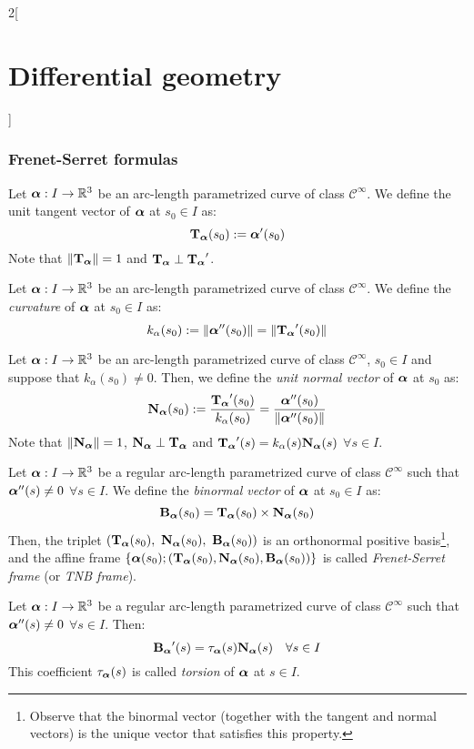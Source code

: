 \documentclass[../../../main.tex]{subfiles}
\begin{document}
\begin{multicols}{2}[\section{Differential geometry}]
  \subsubsection{Frenet-Serret formulas}
  \begin{definition}
    Let $\vf{\alpha}:I\rightarrow\RR^3$ be an arc-length parametrized curve of class $\mathcal{C}^\infty$. We define the unit tangent vector of $\vf{\alpha}$ at $s_0\in I$ as: $$\T\alpha(s_0):=\vf{\alpha}'(s_0)$$ Note that $\|\T\alpha\|=1$ and $\T\alpha\perp\T\alpha'$.
  \end{definition}
  \begin{definition}
    Let $\vf{\alpha}:I\rightarrow\RR^3$ be an arc-length parametrized curve of class $\mathcal{C}^\infty$. We define the \emph{curvature} of $\vf{\alpha}$ at $s_0\in I$ as: $$k_\alpha(s_0):=\|\vf{\alpha}''(s_0)\|=\|\T\alpha'(s_0)\|$$
  \end{definition}
  \begin{definition}
    Let $\vf{\alpha}:I\rightarrow\RR^3$ be an arc-length parametrized curve of class $\mathcal{C}^\infty$, $s_0\in I$ and suppose that $k_\alpha(s_0)\ne 0$. Then, we define the \emph{unit normal vector} of $\vf{\alpha}$ at $s_0$ as: $$\N\alpha(s_0):=\frac{\T\alpha'(s_0)}{k_\alpha(s_0)}=\frac{\vf{\alpha}''(s_0)}{\|\vf{\alpha}''(s_0)\|}$$
    Note that $\|\N\alpha\|=1$, $\N\alpha\perp\T\alpha$ and $\T\alpha'(s)=k_\alpha(s)\N\alpha(s)$ $\forall s\in I$.
  \end{definition}
  \begin{definition}
    Let $\vf{\alpha}:I\rightarrow\RR^3$ be a regular arc-length parametrized curve of class $\mathcal{C}^\infty$ such that $\vf{\alpha}''(s)\ne 0$ $\forall s\in I$. We define the \emph{binormal vector} of $\vf{\alpha}$ at $s_0\in I$ as:
    $$\B\alpha(s_0)=\T\alpha(s_0)\times\N\alpha(s_0)$$
    Then, the triplet $(\T\alpha(s_0),\ \N\alpha(s_0),\ \B\alpha(s_0))$ is an orthonormal positive basis\footnote{Observe that the binormal vector (together with the tangent and normal vectors) is the unique vector that satisfies this property.}, and the affine frame $\{\vf{\alpha}(s_0); (\T\alpha(s_0),\N\alpha(s_0),\B\alpha(s_0))\}$ is called \emph{Frenet-Serret frame} (or \emph{TNB frame}).
  \end{definition}
  \begin{proposition}
    Let $\vf{\alpha}:I\rightarrow\RR^3$ be a regular arc-length parametrized curve of class $\mathcal{C}^\infty$ such that $\vf{\alpha}''(s)\ne 0$ $\forall s\in I$. Then: $$\B\alpha'(s)=\ta\alpha(s)\N\alpha(s)\quad\forall s\in I$$ This coefficient $\ta\alpha(s)$ is called \emph{torsion} of $\vf{\alpha}$ at $s\in I$.

\end{proposition}
\end{multicols}
\end{document}
